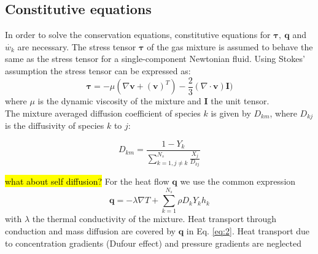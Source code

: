 \subsection{Constitutive equations}
In order to solve the conservation equations, constitutive equations for $\boldsymbol{\tau},  \ \mathbf{q}$ and $\dot{w_k}$ are necessary. The stress tensor $\boldsymbol{\tau}$ of the gas mixture is assumed to behave the same as the stress tensor for a single-component Newtonian fluid. Using Stokes' assumption the stress tensor can be expressed as:
\begin{equation}
\boldsymbol{{\tau}} = -\mu (\nabla \mathbf{v} +(\mathbf{v})^T) - \frac{2}{3}(\nabla \cdot \mathbf{v})\mathbf{I})
\label{eq:1}
\end{equation} 
where $\mu$ is the dynamic viscosity of the mixture and $\mathbf{I}$ the unit tensor. 
\\

The mixture averaged diffusion coefficient of species $k$ is given by $D_{km}$, where $D_{kj}$ is the diffusivity of species $k$ to $j$:

\begin{equation}
D_{km} = \frac{1 - Y_k}{\sum_{k=1,j\neq k}^{N_s}\frac{X_j}{D_{kj}}}
\end{equation}

\hl{what about self diffusion?}
For the heat flow $\mathbf{q}$ we use the common expression
\begin{equation}
\mathbf{q} = -\lambda \nabla T + \sum_{k=1}^{N_s} \rho D_kY_kh_k
\label{eq:2}
\end{equation}
with $\lambda$ the thermal conductivity of the mixture. Heat transport through conduction and mass diffusion are covered by $\mathbf{q}$ in Eq. \ref{eq:2}. Heat transport due to concentration gradients (Dufour effect) and pressure gradients are neglected

